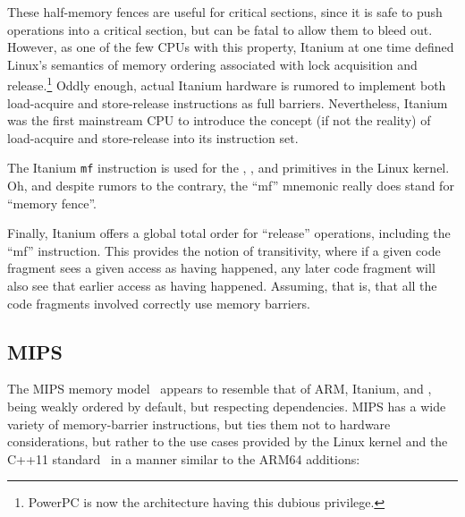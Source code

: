 These half-memory fences are useful for critical sections, since
it is safe to push operations into a critical section, but can be
fatal to allow them to bleed out.
However, as one of the few CPUs with this property, Itanium at one
time defined Linux's semantics of memory ordering associated with lock
acquisition and release.\footnote{
	PowerPC is now the architecture having this dubious privilege.}
Oddly enough, actual Itanium hardware is rumored to implement
both load-acquire and store-release instructions as full barriers.
Nevertheless, Itanium was the first mainstream CPU to introduce the concept
(if not the reality) of load-acquire and store-release into its
instruction set.

The Itanium {\tt mf} instruction is used for the ,
, and  primitives in the Linux kernel.
Oh, and despite rumors to the contrary, the ``mf'' mnemonic really
does stand for ``memory fence''.

Finally, Itanium offers a global total order for ``release'' operations,
including the ``mf'' instruction.
This provides the notion of transitivity, where if a given code fragment
sees a given access as having happened, any later code fragment will
also see that earlier access as having happened.
Assuming, that is, that all the code fragments involved correctly use
memory barriers.

\subsection{MIPS}

The MIPS memory model~\cite[page~479]{MIPSvII-A-2017}
appears to resemble that of ARM, Itanium, and \Power{},
being weakly ordered by default, but respecting dependencies.
MIPS has a wide variety of memory-barrier instructions, but ties them
not to hardware considerations, but rather to the use cases provided
by the Linux kernel and the C++11 standard~\cite{RichardSmith2015N4527}
in a manner similar to the ARM64 additions:

